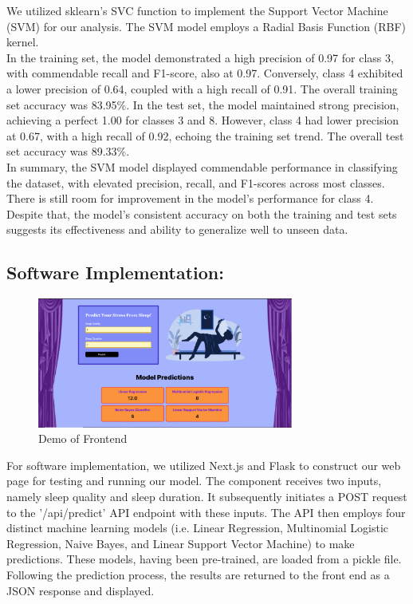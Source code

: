 \documentclass[11pt, letterpaper]{article}
\begin{document}
    \noindent We utilized sklearn's SVC function to implement the Support Vector Machine (SVM) for our analysis. The SVM model employs a Radial Basis Function (RBF) kernel.\\

    \noindent In the training set, the model demonstrated a high precision of 0.97 for class 3, with commendable recall and F1-score, also at 0.97. Conversely, class 4 exhibited a lower precision of 0.64, coupled with a high recall of 0.91. The overall training set accuracy was 83.95\%. In the test set, the model maintained strong precision, achieving a perfect 1.00 for classes 3 and 8. However, class 4 had lower precision at 0.67, with a high recall of 0.92, echoing the training set trend. The overall test set accuracy was 89.33\%.\\
    
    \noindent In summary, the SVM model displayed commendable performance in classifying the dataset, with elevated precision, recall, and F1-scores across most classes. There is still room for improvement in the model's performance for class 4. Despite that, the model's consistent accuracy on both the training and test sets suggests its effectiveness and ability to generalize well to unseen data.

    \noindent\subsection*{Software Implementation:}

    \begin{figure}[H]
        \centering
        \includegraphics[width=0.75\textwidth]{frontend.png}
        \caption{Demo of Frontend}
        \label{fig:frontend}
    \end{figure}

    \noindent For software implementation, we utilized Next.js and Flask to construct our web page for testing and running our model. The component receives two inputs, namely sleep quality and sleep duration. It subsequently initiates a POST request to the '/api/predict' API endpoint with these inputs. The API then employs four distinct machine learning models (i.e. Linear Regression, Multinomial Logistic Regression, Naive Bayes, and Linear Support Vector Machine) to make predictions. These models, having been pre-trained, are loaded from a pickle file. Following the prediction process, the results are returned to the front end as a JSON response and displayed.
\end{document}
